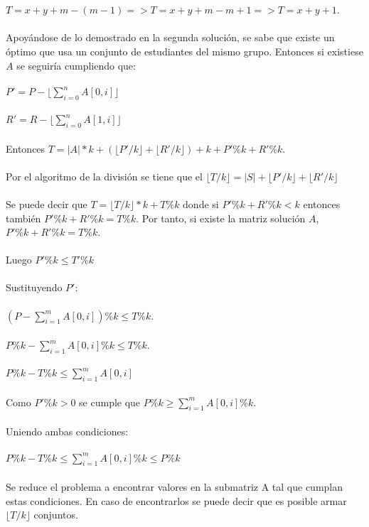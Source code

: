 \documentclass{article}
\begin{document}
\\
\\
$T = x + y + m - (m - 1) = > T = x + y + m - m +1 => T = x + y + 1$.
\\
\\
Apoyándose de lo demostrado en la segunda solución, se sabe que existe un óptimo que usa un conjunto de estudiantes del mismo grupo. Entonces si existiese $A$ se seguiría cumpliendo que:
\\
\\
$P' = P - \lfloor \sum_{i=0}^{n} A[0,i] \rfloor$
\\
\\
$R' = R - \lfloor \sum_{i=0}^{n} A[1,i] \rfloor$
\\
\\
Entonces $T = |A|*k + (\lfloor P'/k \rfloor + \lfloor R'/k \rfloor) + k + P' \% k + R' \% k$.
\\
\\
Por el algoritmo de la división se tiene que el $\lfloor T/k \rfloor = |S| + \lfloor P'/k \rfloor + \lfloor R'/k \rfloor$
\\
\\
Se puede decir que $T = \lfloor T/k \rfloor * k + T\%k$ donde si $P'\%k + R'\%k < k$ entonces también $P'\%k + R'\%k = T\%k$.
Por tanto, si existe la matriz solución $A$, $P'\%k + R'\%k = T\%k$.
\\
\\
Luego $P'\%k \leq T'\% k$
\\
\\
Sustituyendo $P'$:
\\
\\
$(P - \sum_{i=1}^{m} A[0,i]) \% k \leq T\%k$.
\\
\\
$P\%k - \sum_{i=1}^{m} A[0,i] \% k \leq T \% k$.
\\
\\
$P\%k - T \% k \leq \sum_{i=1}^{m} A[0,i]$
\\
\\
Como $P'\%k > 0$ se cumple que $P\%k \geq \sum_{i=1}^{m} A[0,i]\% k$.
\\
\\
Uniendo ambas condiciones:
\\
\\
$P\%k - T\%k \leq \sum_{i=1}^{m} A[0,i]\% k \leq P\%k$
\\
\\
Se reduce el problema a encontrar valores en la submatriz A tal que cumplan estas condiciones. En caso de encontrarlos se puede decir que es posible armar $\lfloor T/k \rfloor$ conjuntos.
\end{document}
